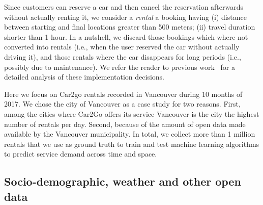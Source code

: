 Since customers can reserve a car and then cancel the reservation afterwards without actually renting it, we consider a \textit{rental} a booking having (i) distance between starting and final locations greater than 500 meters; (ii) travel duration shorter than 1 hour. In a nutshell, we discard those bookings which where not converted into rentals (i.e., when the user reserved the car without actually driving it), and those rentals where the car disappears for long periods (i.e., possibly due to maintenance). We refer the reader to previous work~\citep{UMAP} for a detailed analysis of these implementation decisions.

Here we focus on Car2go rentals recorded in Vancouver during 10 months of 2017. We chose the city of Vancouver as a case study for two reasons. First, among the cities where Car2Go offers its service Vancouver is the city the highest number of rentals per day. Second, because of the amount of open data made available by the Vancouver municipality. In total, we collect more than 1 million rentals that we use as ground truth to train and test machine learning algorithms to predict service demand across time and space.


\subsection{Socio-demographic, weather and other open data}

